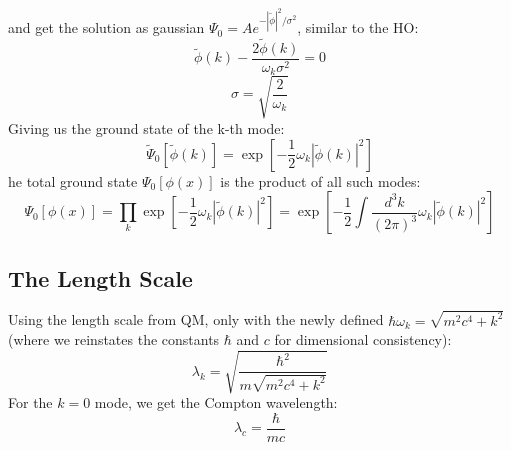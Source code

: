 \documentclass{article}
\begin{document}
and get the solution as gaussian $\Psi_0 = Ae^{-\left|\tilde{\phi}\right|^2/\sigma^2}$, similar to the HO:
\begin{equation}
    \tilde{\phi}(k) - \frac{2\tilde{\phi}(k)}{\omega_k\sigma^2} = 0
\end{equation}
\begin{equation}
    \sigma = \sqrt{\frac{2}{\omega_k}}
\end{equation}
Giving us the ground state of the k-th mode:
\begin{equation}
    \tilde{\Psi}_0[\tilde{\phi}(k)] = \exp[-\frac{1}{2}\omega_k\left|\tilde{\phi}(k)\right|^2]
\end{equation}
he total ground state $\Psi_0[\phi(x)]$ is the product of all such modes:
\begin{equation}
    \Psi_0[\phi(x)] = \prod_{k} \exp[-\frac{1}{2}\omega_k\left|\tilde{\phi}(k)\right|^2] = \exp[-\frac{1}{2}\int \frac{d^3k}{(2\pi)^3} \omega_k \left|\tilde{\phi}(k)\right|^2]
\end{equation}
\subsection{The Length Scale}
Using the length scale from QM, only with the newly defined $\hbar\omega_k = \sqrt{m^2c^4 + k^2}$ (where we reinstates the constants $\hbar$ and $c$ for dimensional consistency):
\begin{equation}
    \lambda_k = \sqrt{\frac{\hbar^2}{m\sqrt{m^2c^4 + k^2}}}
\end{equation}
For the $k = 0$ mode, we get the Compton wavelength:
\begin{equation}
    \lambda_c = \frac{\hbar}{mc}
\end{equation}
\end{document}
